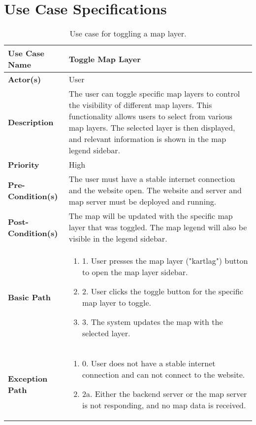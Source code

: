 \chapter{Use Case Specifications}
\label{appendix:use_case_specifications}

\begin{table}[h]
    \centering
    \renewcommand{\arraystretch}{1.5}
    \begin{tabularx}{\textwidth}{|l|X|}
        \hline
        \rowcolor{gray!20}
        \textbf{Use Case Name} & Toggle Map Layer \\
        \hline
        \textbf{Actor(s)} & User \\
        \hline
        \textbf{Description} & The user can toggle specific map layers to control the visibility of different map layers. This functionality allows users to select from various map layers. The selected layer is then displayed, and relevant information is shown in the map legend sidebar. \\
        \hline
        \textbf{Priority} & High \\
        \hline
        \textbf{Pre-Condition(s)} & The user must have a stable internet connection and the website open. The website and server and map server must be deployed and running.\\
        \hline
        \textbf{Post-Condition(s)} & The map will be updated with the specific map layer that was toggled. The map legend will also be visible in the legend sidebar. \\
        \hline
        \textbf{Basic Path} &  
        \begin{enumerate}[label=,left=0pt]
            \item 1. User presses the map layer ("kartlag") button to open the map layer sidebar.
            \item 2. User clicks the toggle button for the specific map layer to toggle.
            \item 3. The system updates the map with the selected layer.
        \end{enumerate} \\
        \hline
        \textbf{Exception Path} & 
        \begin{enumerate}[label=,left=0pt]
            \item 0. User does not have a stable internet connection and can not connect to the website.
            \item 2a. Either the backend server or the map server is not responding, and no map data is received.
        \end{enumerate} \\
        \hline
    \end{tabularx}
    \caption[Use Case Specification: Toggle Map Layer]{Use case for toggling a map layer.}
    \label{tab:use_case_toggle_layer_appendix}
\end{table}

